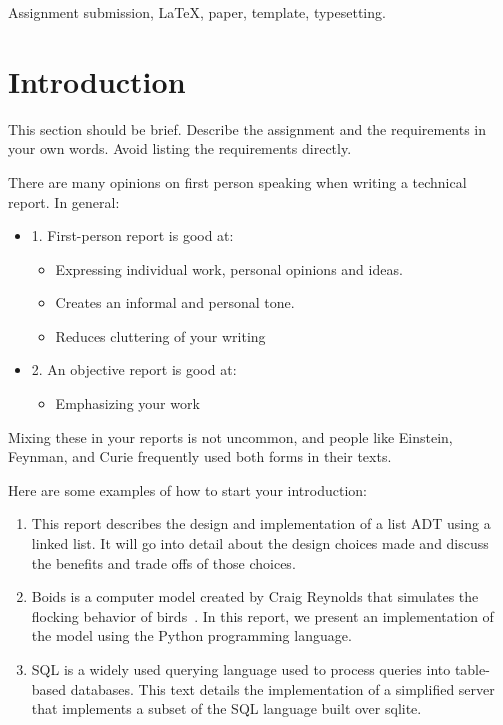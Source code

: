 \documentclass[conference]{IEEEtran}
\begin{document}
\begin{IEEEkeywords}
	Assignment submission, \LaTeX, paper, template, typesetting.
\end{IEEEkeywords}

\section{Introduction}
\label{Section:Introduction}
This section should be brief. Describe the assignment and the requirements in your own words. Avoid listing the requirements directly.


There are many opinions on first person speaking when writing a technical report. In general:

\begin{itemize}
	\item 1. First-person report is good at:
	      \begin{itemize}
		      \item Expressing individual work, personal opinions and ideas.
		      \item Creates an informal and personal tone.
		      \item Reduces cluttering of your writing
	      \end{itemize}
	\item 2. An objective report is good at:
	      \begin{itemize}
		      \item Emphasizing your work
	      \end{itemize}
\end{itemize}


Mixing these in your reports is not uncommon, and people like Einstein, Feynman, and Curie frequently used both forms in their texts.


Here are some examples of how to start your introduction:

\begin{enumerate}
	\item This report describes the design and implementation of a list ADT using a linked list. It will go into detail about the design choices made and discuss the benefits and trade offs of those choices.
	\item Boids is a computer model created by Craig Reynolds that simulates the flocking behavior of birds~\cite{TanenbaumAndrewS.2024Mos}. In this report, we present an implementation of the model using the Python programming language.
	\item SQL is a widely used querying language used to process queries into table-based databases. This text details the implementation of a simplified server that implements a subset of the SQL language built over sqlite.
\end{enumerate}
\end{document}

